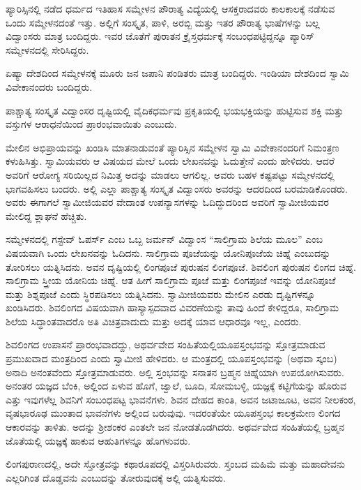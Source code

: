  ಪ್ಯಾರಿಸ್ಸಿನಲ್ಲಿ ನಡೆದ ಧರ್ಮದ ಇತಿಹಾಸ ಸಮ್ಮೇಳನ ಪೌರಾತ್ಯ ವಿದ್ಯೆಯಲ್ಲಿ ಆಸಕ್ತರಾದವರು ಕಾಲಕಾಲಕ್ಕೆ ನಡೆಸುವ ಒಂದು ಸಮ್ಮೇಳನದಂತೆ ಇತ್ತು. ಅಲ್ಲಿಗೆ ಸಂಸ್ಕೃತ, ಪಾಳಿ, ಅರಬ್ಬಿ ಮತ್ತು ಇತರ ಪೌರಾತ್ಯ ಭಾಷೆಗಳನ್ನು ಬಲ್ಲ ವಿದ್ವಾಂಸರು ಮಾತ್ರ ಬಂದಿದ್ದರು. ಇವರ ಜೊತೆಗೆ ಪುರಾತನ ಕ್ರೈಸ್ತಧರ್ಮಕ್ಕೆ ಸಂಬಂಧಪಟ್ಟಿದ್ದನ್ನೂ ಪ್ಯಾರಿಸ್ ಸಮ್ಮೇಳನದಲ್ಲಿ ಸೇರಿಸಿದ್ದರು. 

 ಏಷ್ಯಾ ದೇಶದಿಂದ ಸಮ್ಮೇಳನಕ್ಕೆ ಮೂರು ಜನ ಜಪಾನಿ ಪಂಡಿತರು ಮಾತ್ರ ಬಂದಿದ್ದರು. ಇಂಡಿಯಾ ದೇಶದಿಂದ ಸ್ವಾಮಿ ವಿವೇಕಾನಂದರು ಬಂದಿದ್ದರು. 

 ಪಾಶ್ಚಾತ್ಯ ಸಂಸ್ಕೃತ ವಿದ್ವಾಂಸರ ದೃಷ್ಟಿಯಲ್ಲಿ ವೈದಿಕಧರ್ಮವು ಪ್ರಕೃತಿಯಲ್ಲಿ ಭಯಭಕ್ತಿಯನ್ನು ಹುಟ್ಟಿಸುವ ಶಕ್ತಿ ಮತ್ತು ವಸ್ತುಗಳ ಆರಾಧನೆಯಿಂದ ಪ್ರಾರಂಭವಾಯಿತು ಎಂಬುದು. 

 ಮೇಲಿನ ಅಭಿಪ್ರಾಯವನ್ನು ಖಂಡಿಸಿ ಮಾತನಾಡುವಂತೆ ಪ್ಯಾರಿಸ್ಸಿನ ಸಮ್ಮೇಳನ ಸ್ವಾಮಿ ವಿವೇಕಾನಂದರಿಗೆ ನಿಮಂತ್ರಣ ಕಳುಹಿಸಿತ್ತು. ಸ್ವಾಮಿಯವರು ಆ ‌ವಿಷಯದ ಮೇಲೆ ಒಂದು ಲೇಖನವನ್ನು ಓದುತ್ತೇನೆ ಎಂದು ಹೇಳಿದರು. ಆದರೆ ಅವರಿಗೆ ಆರೋಗ್ಯ ಸರಿಯಿಲ್ಲದ ನಿಮಿತ್ತ ಅದನ್ನು ಮಾಡಲು ಆಗಲಿಲ್ಲ. ಅವರು ಬಹಳ ಕಷ್ಟಪಟ್ಟು ಸಮ್ಮೇಳನದಲ್ಲಿ ಭಾಗವಹಿಸಲು ಬಂದರು. ಅಲ್ಲಿ ಎಲ್ಲಾ ಪಾಶ್ಚಾತ್ಯ ಸಂಸ್ಕೃತ ವಿದ್ವಾಂಸರು ಅವರನ್ನು ಆದರದಿಂದ ಬರಮಾಡಿಕೊಂಡರು. ಅವರು ಈಗಾಗಲೆ ಸ್ವಾಮೀಜಿಯವರ ವೇದಾಂತ ಉಪನ್ಯಾಸಗಳನ್ನು ಓದಿದ್ದುದರಿಂದ ಅವರಿಗೆ ಸ್ವಾಮೀಜಿಯವರ ಮೇಲಿದ್ದ ಶ್ಲಾಘನೆ ಹೆಚ್ಚಿತು. 

 ಸಮ್ಮೇಳನದಲ್ಲಿ ಗಸ್ಟೇವ್ ಓಪರ್ಸ್ ಎಂಬ ಒಬ್ಬ ಜರ್ಮನ್ ವಿದ್ವಾಂಸ “ಸಾಲಿಗ್ರಾಮ ಶಿಲೆಯ ಮೂಲ” ಎಂಬ ವಿಷಯವಾಗಿ ಒಂದು ಲೇಖನವನ್ನು ಓದಿದನು. ಸಾಲಿಗ್ರಾಮ ಪೂಜೆಯನ್ನು ಯೋನಿಪೂಜೆಯ ಚಿಹ್ನೆ ಎಂಬುದನ್ನು ತೋರಿಸಲು ಯತ್ನಿಸಿದನು. ಅವನ ದೃಷ್ಟಿಯಲ್ಲಿ ಲಿಂಗಪೂಜೆ ಪುರುಷನ ಲಿಂಗಪೂಜೆ. ಶಿವಲಿಂಗ ಪುರುಷನ ಲಿಂಗದ ಚಿಹ್ನೆ. ಸಾಲಿಗ್ರಾಮ ಸ್ತ್ರೀಯ ಯೋನಿಯ ಚಿಹ್ನೆ. ಆತ ಹೀಗೆ ಸಾಲಿಗ್ರಾಮ ಪೂಜೆ ಮತ್ತು ಲಿಂಗಪೂಜೆ ಇವನ್ನು ಯೋನಿಪೂಜೆ ಮತ್ತು ಶಿಶ್ನಪೂಜೆ ಎಂದು ಸ್ಥಿರಪಡಿಸಲು ಯತ್ನಿಸಿದನು. ಸ್ವಾಮೀಜಿಯವರು ಮೇಲಿನ ಎರಡು ದೃಷ್ಟಿಗಳನ್ನೂ ಖಂಡಿಸಿದರು. ಶಿವಲಿಂಗದ ವಿಷಯವಾಗಿ ಹಾಸ್ಯಾಸ್ಪದವಾದ ವಿವರಣೆಯನ್ನು ತಾವು ಹಿಂದೆ ಕೇಳಿದ್ದರೂ, ಸಾಲಿಗ್ರಾಮ ಶಿಲೆಯ ಸಿದ್ಧಾಂತವಾದರೊ ಅತಿ ವಿಚಿತ್ರವಾದುದು ಮತ್ತು ಅದಕ್ಕೆ ಯಾವ ಆಧಾರವೂ ಇಲ್ಲ, ಎಂದರು. 

 ಶಿವಲಿಂಗದ ಉಪಾಸನೆ ಪ್ರಾರಂಭವಾದದ್ದು, ಅಥರ್ವವೇದ ಸಂಹಿತೆಯಲ್ಲಿ\break ಯೂಪಸ್ತಂಭವನ್ನು ಸ್ತೋತ್ರಮಾಡುವ ಪ್ರಮುಖವಾದ ಮಂತ್ರದಿಂದ ಎಂದು ಸ್ವಾಮೀಜಿ ಹೇಳಿದರು. ಆ ಮಂತ್ರದಲ್ಲಿ ಯೂಪಸ್ತಂಭವನ್ನು (ಅಥವಾ ಸ್ಕಂಬ) ಅನಾದಿ ಅನಂತವೆಂದು ಸ್ತೋತ್ರಮಾಡುವರು. ಅಲ್ಲಿ ಸ್ತಂಭವನ್ನು ಸನಾತನ ಬ್ರಹ್ಮನ ಚಿಹ್ನೆಯಾಗಿ ಉಪಯೋಗಿಸುವರು. ಅನಂತರ ಯಜ್ಞದ ಬೆಂಕಿ, ಅಲ್ಲಿಂದ ಏಳುವ ಹೊಗೆ, ಜ್ವಾಲೆ, ಬೂದಿ, ಸೋಮಬಳ್ಳಿ, ಯಜ್ಞಕ್ಕೆ ಕಟ್ಟಿಗೆಯನ್ನು ಹೊರುವ ಎತ್ತು ಇವುಗಳೆಲ್ಲ ಶಿವನಿಗೆ ಸಂಬಂಧಪಟ್ಟ ಭಾವನೆಗಳು. ಶಿವನ ದೇಹದ ಕಾಂತಿ, ಅವನ ಜಟಾಜೂಟ, ಅವನ ನೀಲಕಂಠ, ವೃಷಭಾರೂಢ ಮುಂತಾದ ಭಾವನೆಗಳು ಅಲ್ಲಿಂದ ಬರುವುವು. ಇದರಂತೆಯೇ ಯೂಪಸ್ತಂಭ ಕಾಲಕ್ರಮೇಣ ಲಿಂಗದ ಆಕಾರವನ್ನು ತಾಳಿತು. ಅದನ್ನು ಶ‍್ರೀಶಂಕರ ಎಂತಲೇ ಜನ ನೋಡತೊಡಗಿದರು. ಅಥರ್ವವೇದ ಸಂಹಿತೆಯಲ್ಲಿ ಬ್ರಹ್ಮನ ಜೊತೆಯಲ್ಲಿ ಯಜ್ಞಕ್ಕೆ ಹಾಕುವ ಆಹುತಿಗಳನ್ನೂ ಹೊಗಳುವರು. 

 ಲಿಂಗಪುರಾಣದಲ್ಲಿ, ಅದೇ ಸ್ತೋತ್ರವನ್ನು ಕಥಾರೂಪದಲ್ಲಿ ವಿಸ್ತರಿಸಿರುವರು. ಸ್ತಂಬದ ಮಹಿಮೆ ಮತ್ತು ಮಹಾದೇವನು ಎಲ್ಲರಿಗಿಂತ ದೊಡ್ಡವನು ಎಂಬುದನ್ನು ತೋರುವುದಕ್ಕೆ ಅಲ್ಲಿ ಯತ್ನಿಸುವರು. 

